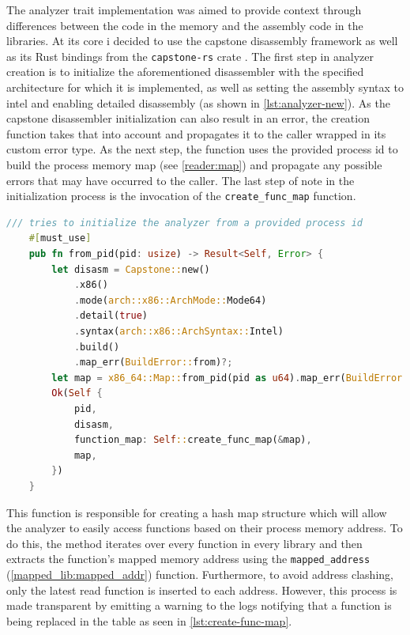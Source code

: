The analyzer trait implementation was aimed to provide context through differences between the code in the memory and the assembly code in the libraries.
At its core i decided to use the capstone \cite{capstone-engine_team_capstone-enginecapstone_2022} disassembly framework as well as its Rust bindings from the \verb|capstone-rs| crate \cite{finkenauer_capstone-rustcapstone-rs_nodate}.
The first step in analyzer creation is to initialize the aforementioned disassembler with the specified architecture for which it is implemented, as well as setting the assembly syntax to intel and enabling detailed disassembly (as shown in \autoref{lst:analyzer-new}).
As the capstone disassembler initialization can also result in an error, the creation function takes that into account and propagates it to the caller wrapped in its custom error type.
As the next step, the function uses the provided process id to build the process memory map (see \autoref{reader:map}) and propagate any possible errors that may have occurred to the caller.
The last step of note in the initialization process is the invocation of the \verb|create_func_map| function.

\begin{lstlisting}[caption=\label{lst:analyzer-new}{The analyzer creator function}, language=Rust]
    /// tries to initialize the analyzer from a provided process id
    #[must_use]
    pub fn from_pid(pid: usize) -> Result<Self, Error> {
        let disasm = Capstone::new()
            .x86()
            .mode(arch::x86::ArchMode::Mode64)
            .detail(true)
            .syntax(arch::x86::ArchSyntax::Intel)
            .build()
            .map_err(BuildError::from)?;
        let map = x86_64::Map::from_pid(pid as u64).map_err(BuildError::from)?;
        Ok(Self {
            pid,
            disasm,
            function_map: Self::create_func_map(&map),
            map,
        })
    }
\end{lstlisting}

This function is responsible for creating a hash map structure which will allow the analyzer to easily access functions based on their process memory address.
To do this, the method iterates over every function in every library and then extracts the function's mapped memory address using the \verb|mapped_address| (\autoref{mapped_lib:mapped_addr}) function.
Furthermore, to avoid address clashing, only the latest read function is inserted to each address. However, this process is made transparent by emitting a warning to the logs notifying that a function is being replaced in the table as seen in \autoref{lst:create-func-map}.

